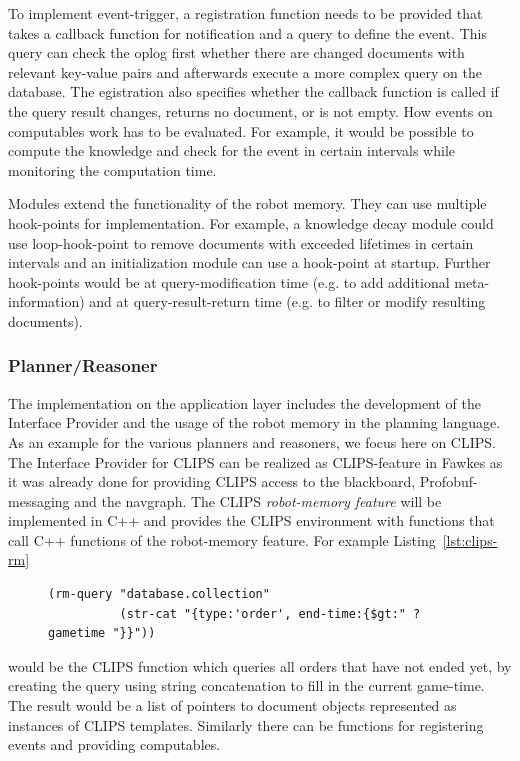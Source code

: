 \documentclass[a4paper,11pt]{article}
\newcommand{\reflst}[1]{Listing~\ref{#1}}
\begin{document}
To implement event-trigger, a registration function needs to be
provided that takes a callback function for notification and a query
to define the event. This query can check the oplog first whether
there are changed documents with relevant key-value pairs and
afterwards execute a more complex query on the database. The
egistration also specifies whether the callback
function is called if the query result changes, returns no document, or
is not empty. How events on
computables work has to be evaluated. For example, it would be
possible to compute the knowledge and check for the event in
certain intervals while monitoring the computation time.

Modules extend the functionality of the robot memory. They can use
multiple hook-points for implementation. For example, a knowledge decay
module could use loop-hook-point to remove documents with exceeded
lifetimes in certain intervals and an initialization module can use a
hook-point at startup. Further hook-points would be at
query-modification time (e.g. to add additional meta-information) and
at query-result-return time (e.g. to filter or modify resulting
documents).

\subsubsection{Planner/Reasoner}
\label{sec:impl-planner}
The implementation on the application layer includes the development
of the Interface Provider and the usage of the robot memory in the
planning language. As an example for the various planners and
reasoners, we focus here on CLIPS. The Interface Provider for CLIPS
can be realized as CLIPS-feature in Fawkes as it was already done for
providing CLIPS access to the blackboard, Profobuf-messaging and the
navgraph. The CLIPS \emph{robot-memory feature} will be implemented in C++
and provides the CLIPS environment with functions that call C++
functions of the robot-memory feature. For example \reflst{lst:clips-rm}
\begin{figure}
  \begin{lstlisting}[showlines,style=ReallySmallCLIPS, caption={CLIPS function to execute a query},
  label=lst:clips-rm,
  emph={skill, args, state, target, res},
  emphstyle=\bfseries\color{green!80!black},
  emph={[2]\?skill, \$\?args, wait-for-lock, \?target, use,
  WAIT-FOR-LOCK, SKILL-EXECUTION, running},
  emphstyle={[2]\bfseries\color{blue!80!black}},
  morekeywords={retract, assert, modify, skill-call, skill-to-execute,
    wait-for-lock}]
(rm-query "database.collection"
          (str-cat "{type:'order', end-time:{$gt:" ?gametime "}}"))
\end{lstlisting} %
\end{figure}
would be the CLIPS function which queries all orders that have not
ended yet, by creating the query using string concatenation to fill in
the current game-time. The result would be a list of pointers to document
objects represented as instances of CLIPS templates. Similarly there
can be functions for registering events and providing computables.
\end{document}
